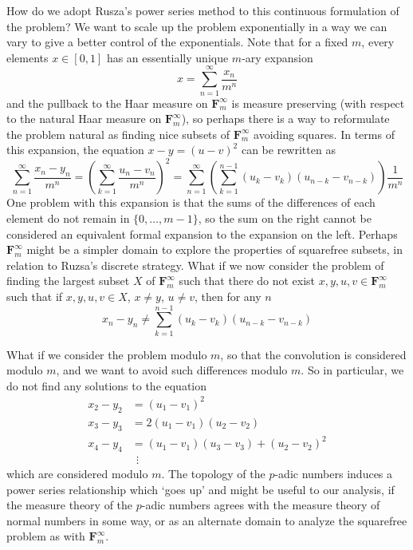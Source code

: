 \documentclass{report}
\theoremstyle{plain}
\theoremstyle{plain}
\begin{document}
How do we adopt Rusza's power series method to this continuous formulation of the problem? We want to scale up the problem exponentially in a way we can vary to give a better control of the exponentials. Note that for a fixed $m$, every elements $x \in [0,1]$ has an essentially unique $m$-ary expansion
%
\[ x = \sum_{n = 1}^\infty \frac{x_n}{m^n} \]
%
and the pullback to the Haar measure on $\mathbf{F}_m^\infty$ is measure preserving (with respect to the natural Haar measure on $\mathbf{F}_m^\infty$), so perhaps there is a way to reformulate the problem natural as finding nice subsets of $\mathbf{F}_m^\infty$ avoiding squares. In terms of this expansion, the equation $x - y = (u - v)^2$ can be rewritten as
%
\[ \sum_{n = 1}^\infty \frac{x_n - y_n}{m^n} = \left( \sum_{k = 1}^\infty \frac{u_n - v_n}{m^n} \right)^2 = \sum_{n = 1}^\infty \left( \sum_{k = 1}^{n-1} (u_k - v_k)(u_{n-k} - v_{n-k}) \right) \frac{1}{m^n} \]
%
One problem with this expansion is that the sums of the differences of each element do not remain in $\{ 0, \dots, m-1 \}$, so the sum on the right cannot be considered an equivalent formal expansion to the expansion on the left. Perhaps $\mathbf{F}_m^\infty$ might be a simpler domain to explore the properties of squarefree subsets, in relation to Ruzsa's discrete strategy. What if we now consider the problem of finding the largest subset $X$ of $\mathbf{F}_m^\infty$ such that there do not exist $x,y,u,v \in \mathbf{F}_m^\infty$ such that if $x,y,u,v \in X$, $x \neq y$, $u \neq v$, then for any $n$
%
\[ x_n - y_n \neq \sum_{k = 1}^{n-1} (u_k - v_k)(u_{n-k} - v_{n-k}) \]

What if we consider the problem modulo $m$, so that the convolution is considered modulo $m$, and we want to avoid such differences modulo $m$. So in particular, we do not find any solutions to the equation
%
\begin{align*}
    x_2 - y_2 &= (u_1 - v_1)^2\\
    x_3 - y_3 &= 2 (u_1 - v_1)(u_2 - v_2)\\
    x_4 - y_4 &= (u_1 - v_1)(u_3 - v_3) + (u_2 - v_2)^2\\
    &\ \ \vdots
\end{align*}
%
which are considered modulo $m$. The topology of the $p$-adic numbers induces a power series relationship which `goes up' and might be useful to our analysis, if the measure theory of the $p$-adic numbers agrees with the measure theory of normal numbers in some way, or as an alternate domain to analyze the squarefree problem as with $\mathbf{F}_m^\infty$.
\end{document}
